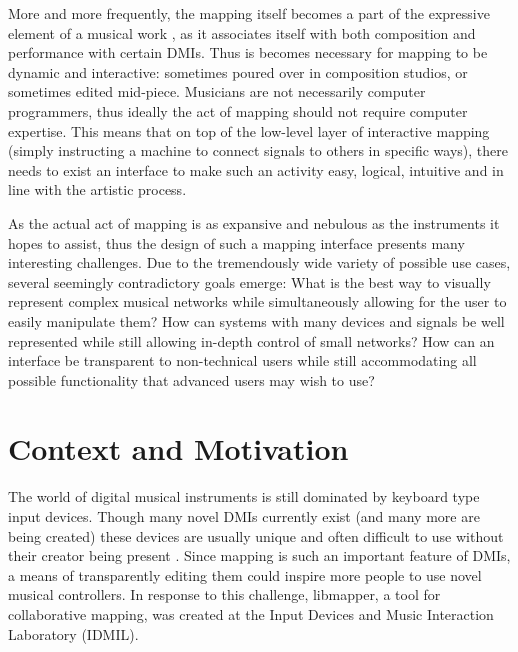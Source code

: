 More and more frequently, the mapping itself becomes a part of the expressive element of a musical work ,
as it associates itself with both composition and performance with certain DMIs. Thus is becomes necessary for mapping to be dynamic and interactive: sometimes poured over in composition studios, or sometimes edited mid-piece. Musicians are not necessarily computer programmers, thus ideally the act of mapping should not require computer expertise. This means that on top of the low-level layer of interactive mapping (simply instructing a machine to connect signals to others in specific ways), there needs to exist an interface to make such an activity easy, logical, intuitive and in line with the artistic process.

As the actual act of mapping is as expansive and nebulous as the instruments it hopes to assist, thus the design of such a mapping interface presents many interesting challenges. Due to the tremendously wide variety of possible use cases, several seemingly contradictory goals emerge: What is the best way to visually represent complex musical networks while simultaneously allowing for the user to easily manipulate them? How can systems with many devices and signals be well represented while still allowing in-depth control of small networks? How can an interface be transparent to non-technical users while still accommodating all possible functionality that advanced users may wish to use? 


\section{Context and Motivation}

The world of digital musical instruments is still dominated by keyboard type input devices. Though many novel DMIs currently exist (and many more are being created) these devices are usually unique and often difficult to use without their creator being present \cite{squeezevox}.
Since mapping is such an important feature of DMIs, a means of transparently editing them could inspire more people to use novel musical controllers. In response to this challenge, libmapper, a tool for collaborative mapping, was created at the Input Devices and Music Interaction Laboratory (IDMIL).

